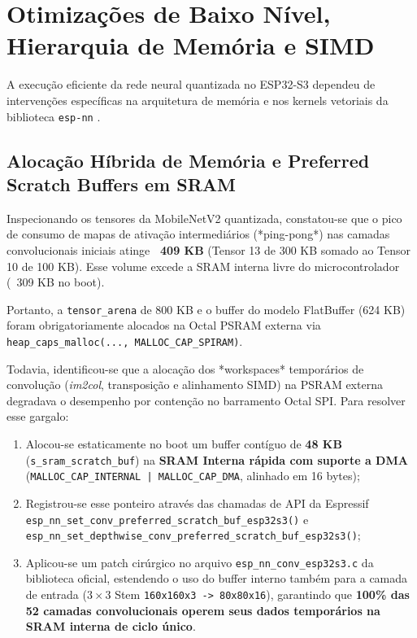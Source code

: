 \section{Otimizações de Baixo Nível, Hierarquia de Memória e SIMD}
\label{sec:otimizacoes_baixo_nivel}

A execução eficiente da rede neural quantizada no ESP32-S3 dependeu de intervenções específicas na arquitetura de memória e nos kernels vetoriais da biblioteca \texttt{esp-nn} \cite{espressif2023espnn}.

\subsection{Alocação Híbrida de Memória e Preferred Scratch Buffers em SRAM}

Inspecionando os tensores da MobileNetV2 quantizada, constatou-se que o pico de consumo de mapas de ativação intermediários (*ping-pong*) nas camadas convolucionais iniciais atinge \textbf{~409 KB} (Tensor 13 de 300 KB somado ao Tensor 10 de 100 KB). Esse volume excede a SRAM interna livre do microcontrolador (~309 KB no boot).

Portanto, a \texttt{tensor\_arena} de 800 KB e o buffer do modelo FlatBuffer (624 KB) foram obrigatoriamente alocados na Octal PSRAM externa via \texttt{heap\_caps\_malloc(..., MALLOC\_CAP\_SPIRAM)}.

Todavia, identificou-se que a alocação dos *workspaces* temporários de convolução (\textit{im2col}, transposição e alinhamento SIMD) na PSRAM externa degradava o desempenho por contenção no barramento Octal SPI. Para resolver esse gargalo:
\begin{enumerate}
    \item Alocou-se estaticamente no boot um buffer contíguo de \textbf{48 KB} (\texttt{s\_sram\_scratch\_buf}) na \textbf{SRAM Interna rápida com suporte a DMA} (\texttt{MALLOC\_CAP\_INTERNAL | MALLOC\_CAP\_DMA}, alinhado em 16 bytes);
    \item Registrou-se esse ponteiro através das chamadas de API da Espressif \texttt{esp\_nn\_set\_conv\_preferred\_scratch\_buf\_esp32s3()} e \texttt{esp\_nn\_set\_depthwise\_conv\_preferred\_scratch\_buf\_esp32s3()};
    \item Aplicou-se um patch cirúrgico no arquivo \texttt{esp\_nn\_conv\_esp32s3.c} da biblioteca oficial, estendendo o uso do buffer interno também para a camada de entrada ($3\times3$ Stem \texttt{160x160x3 -> 80x80x16}), garantindo que \textbf{100\% das 52 camadas convolucionais operem seus dados temporários na SRAM interna de ciclo único}.
\end{enumerate}

